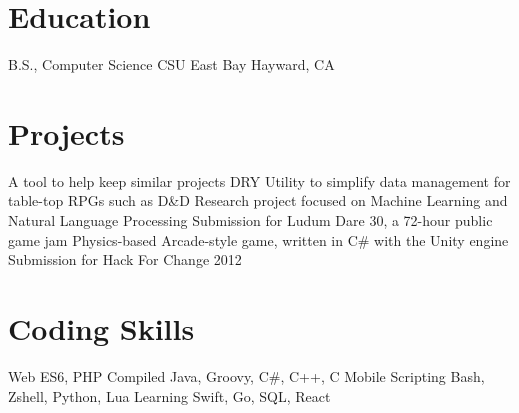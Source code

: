 \documentclass[11pt,a4paper,sans]{moderncv}        %
\begin{document}
\section{Education}         %
  {B.S., Computer Science}
        {CSU East Bay}              {Hayward, CA}               {}{}  %

\section{Projects}          %
                     {A tool to help keep similar projects DRY}
             {Utility to simplify data management for table-top RPGs such as D\&D}
                      {Research project focused on Machine Learning and Natural Language Processing}
                  {Submission for Ludum Dare 30, a 72-hour public game jam}
                         {Physics-based Arcade-style game, written in C\# with the Unity engine}
	        {Submission for Hack For Change 2012}

\section{Coding Skills}     %
\cvdoubleitem
{Web}               {ES6, PHP}
{Compiled}          {Java, Groovy, C\#, C++, C}
{Mobile}
\cvdoubleitem
{Scripting}         {Bash, Zshell, Python, Lua}
{Learning}          {Swift, Go, SQL, React}
\end{document}
